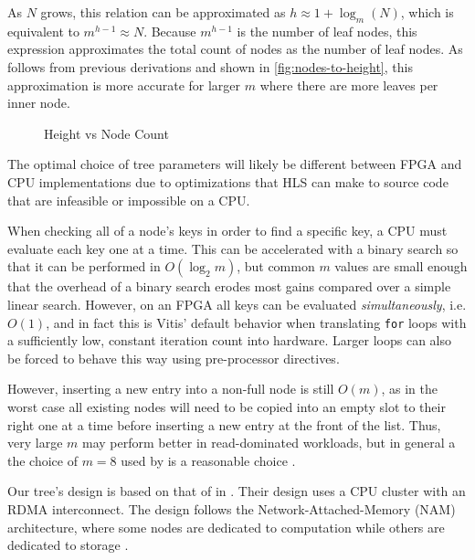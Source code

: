 As $N$ grows, this relation can be approximated as $h \approx 1 + \log_m(N)$,
which is equivalent to  $m^{h-1} \approx N$. Because $m^{h-1}$ is the number of
leaf nodes, this expression approximates the total count of nodes as the number
of leaf nodes. As follows from previous derivations and shown in
\autoref{fig:nodes-to-height}, this approximation is more accurate for larger
$m$ where there are more leaves per inner node.

\begin{figure}[H]
	\centering
	
	\caption{Height vs Node Count}
	\label{fig:nodes-to-height}
\end{figure}



The optimal choice of tree parameters will likely be different between FPGA and
CPU implementations due to optimizations that HLS can make to source code that
are infeasible or impossible on a CPU.

When checking all of a node's keys in order to find a specific key, a CPU must
evaluate each key one at a time. This can be accelerated with a binary search so
that it can be performed in $O(\log_2 m)$, but common $m$ values are small
enough that the overhead of a binary search erodes most gains compared over a
simple linear search.
%
However, on an FPGA all keys can be evaluated \emph{simultaneously}, i.e.
$O(1)$, and in fact this is Vitis' default behavior when translating
\texttt{for} loops with a sufficiently low, constant iteration count into
hardware. Larger loops can also be forced to behave this way using pre-processor
directives.

However, inserting a new entry into a non-full node is still $O(m)$, as in the
worst case all existing nodes will need to be copied into an empty slot to their
right one at a time before inserting a new entry at the front of the list. Thus,
very large $m$ may perform better in read-dominated workloads, but in general a
the choice of $m=8$ used by \citeauthor{ren-fpl-2019} is a reasonable choice
\autocite{ren-fpl-2019}.


\label{subsec:concurrency}

Our tree's design is based on that of \citeauthor{base} in .
Their design uses a CPU cluster with an RDMA interconnect. The design follows
the Network-Attached-Memory (NAM) architecture, where some nodes are dedicated
to computation while others are dedicated to storage
\autocite{base,binnig-vldb-2016}.

